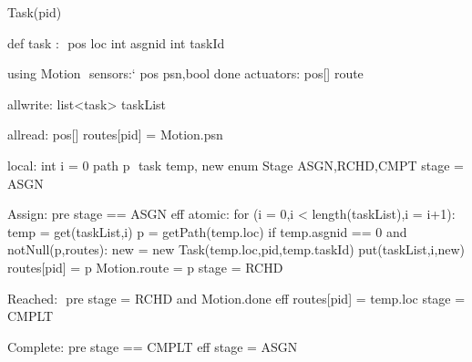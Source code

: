 Task(pid)

def task : $\label{taskdef}$
    pos loc
    int asgnid
    int taskId

using Motion $\label{moddef}$
    sensors:`
       pos psn,bool done
    actuators:
       pos[] route

allwrite:$\label{awvar}$
   list<task> taskList
 
allread:$\label{arvar}$
   pos[] routes[pid] = Motion.psn

local:
   int i = 0 
   path p $\label{pathvar}$
   task temp, new
   enum Stage {ASGN,RCHD,CMPT} stage
                             = ASGN
   
Assign:$\label{asgnevent}$
  pre stage == ASGN
  eff atomic:
    for (i = 0,i < length(taskList),i = i+1):
        temp = get(taskList,i)
        p = getPath(temp.loc)
        if temp.asgnid == 0 and notNull(p,routes):
           new = new Task(temp.loc,pid,temp.taskId)
           put(taskList,i,new)
           routes[pid] = p
           Motion.route = p 
           stage = RCHD          
   
Reached: $\label{rchevent}$
  pre stage = RCHD and Motion.done
  eff routes[pid] = temp.loc
      stage = CMPLT

Complete:$\label{cmpltevent}$
  pre stage == CMPLT
  eff stage = ASGN